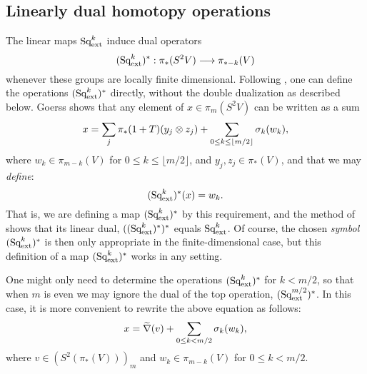 \documentclass[11pt]{amsart}
\theoremstyle{plain}
\theoremstyle{definition}
\renewcommand{\to}{\longrightarrow}
\newcommand{\calc}{\mathcal{C}}
\theoremstyle{plain}
\newcommand{\ExtCohOp}{\textup{Sq}_\textup{ext}}
\begin{document}
\begin{Constructing (co)homotopy operations}
\begin{shaded}
\end{shaded}

\subsection{Linearly dual homotopy operations}\label{Linearly dual homotopy operations}
The linear maps $\ExtCohOp^k$ induce dual operators
\[(\ExtCohOp^k)^*:\pi_*(S^2V)\to \pi_{*-k}(V)\]
whenever these groups are locally finite dimensional. Following \cite[\S3]{MR1089001}, one can define the operations $(\ExtCohOp^k)^*$ directly, without the double dualization as described below. %
Goerss \cite[Proposition 3.7]{MR1089001}
shows that any element of $x\in \pi_m(S^2V)$ can be written as a sum
\[x=\sum_j\pi_*(1+T)(y_j\otimes z_j)+\sum_{\smash{0\leq k\leq \lfloor m/2\rfloor}}\sigma_k(w_k),\]
where $w_k\in \pi_{m-k}(V)$ for $0\leq k\leq\lfloor m/2\rfloor$, and $y_j,z_j\in \pi_{*}(V)$, and that we may \emph{define}:
\[(\ExtCohOp^k)^*(x)=w_k.\]
That is, we are defining a map $(\ExtCohOp^k)^*$ by this requirement, and the method of \cite[\S3]{MR1089001} shows that its linear dual, $((\ExtCohOp^k)^*)^*$ equals $\ExtCohOp^k$. Of course, the chosen \emph{symbol} $(\ExtCohOp^k)^*$ is then only appropriate in the finite-dimensional case, but this definition of a map $(\ExtCohOp^k)^*$ works in any setting.

One might only need to determine the operations $(\ExtCohOp^k)^*$ for $k<m/2$, so that when $m$ is even we may ignore the dual of the top operation, $(\ExtCohOp^{m/2})^*$. In this case, it is more convenient to rewrite the above equation as follows: 
\[x=\widetilde{\nabla}(v)+\sum_{\smash{0\leq k< m/2}}\sigma_k(w_k),\]
where $v\in(S^2(\pi_*(V)))_{m}$ and $w_k\in \pi_{m-k}(V)$ for $0\leq k<m/2$.



\end{Constructing (co)homotopy operations}
\end{document}
